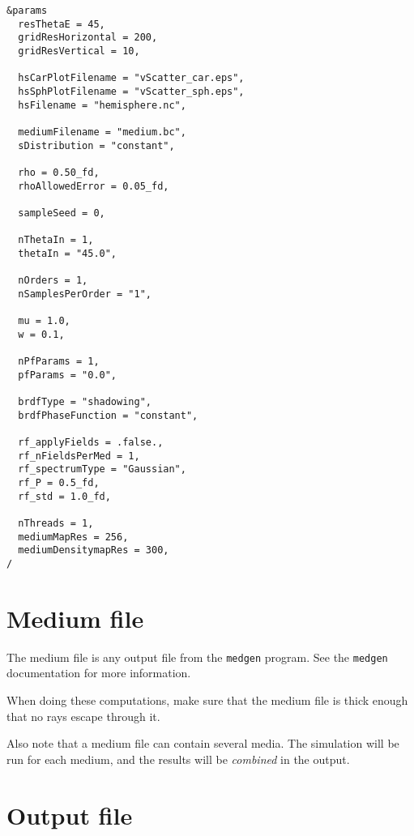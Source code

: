 \documentclass[a4paper]{article}
\newcommand{\code}[1]{\lstinline{#1}}
\begin{document}
\begin{lstlisting}[float, frame=trbl, caption="Example input file", label=inputlst]
&params
  resThetaE = 45,
  gridResHorizontal = 200,
  gridResVertical = 10,

  hsCarPlotFilename = "vScatter_car.eps",
  hsSphPlotFilename = "vScatter_sph.eps",
  hsFilename = "hemisphere.nc",

  mediumFilename = "medium.bc",
  sDistribution = "constant",

  rho = 0.50_fd,
  rhoAllowedError = 0.05_fd,

  sampleSeed = 0,

  nThetaIn = 1,
  thetaIn = "45.0",

  nOrders = 1,
  nSamplesPerOrder = "1",

  mu = 1.0,
  w = 0.1,

  nPfParams = 1,
  pfParams = "0.0",

  brdfType = "shadowing",
  brdfPhaseFunction = "constant",

  rf_applyFields = .false.,
  rf_nFieldsPerMed = 1,
  rf_spectrumType = "Gaussian",
  rf_P = 0.5_fd,
  rf_std = 1.0_fd,

  nThreads = 1,
  mediumMapRes = 256,
  mediumDensitymapRes = 300,
/

\end{lstlisting}

\section{Medium file}\label{medium}

The medium file is any output file from the \code{medgen} program. See the \code{medgen} documentation for more information. 

When doing these computations, make sure that the medium file is thick enough that no rays escape through it.

Also note that a medium file can contain several media. The simulation will be run for each medium, and the results will be \emph{combined} in the output.


\section{Output file}\label{output}
\end{document}
